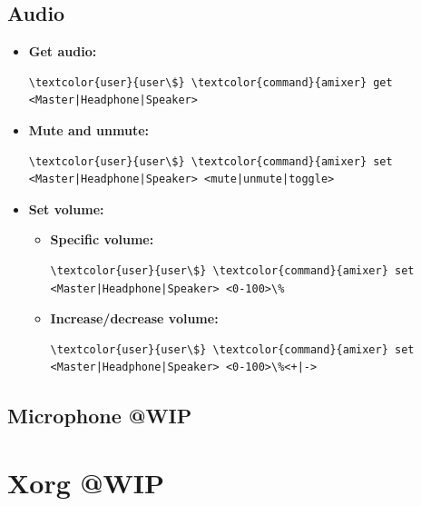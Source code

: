 \documentclass[10pt, a4paper, onecolumn, oneside, titlepage, openany]{book}
\begin{document}
\section{Audio}
\begin{itemize}
    \item \textbf{Get audio:}
\begin{Verbatim}[commandchars=\\\{\}]
\textcolor{user}{user\$} \textcolor{command}{amixer} get <Master|Headphone|Speaker>
\end{Verbatim}
    \item \textbf{Mute and unmute:}
\begin{Verbatim}[commandchars=\\\{\}]
\textcolor{user}{user\$} \textcolor{command}{amixer} set <Master|Headphone|Speaker> <mute|unmute|toggle>
\end{Verbatim}
    \item \textbf{Set volume:}
    \begin{itemize}
        \item \textbf{Specific volume:}
\begin{Verbatim}[commandchars=\\\{\}]
\textcolor{user}{user\$} \textcolor{command}{amixer} set <Master|Headphone|Speaker> <0-100>\%
\end{Verbatim}        
        \item \textbf{Increase/decrease volume:}
\begin{Verbatim}[commandchars=\\\{\}]
\textcolor{user}{user\$} \textcolor{command}{amixer} set <Master|Headphone|Speaker> <0-100>\%<+|->
\end{Verbatim}   
    \end{itemize}
\end{itemize}

\section{Microphone @WIP}


\chapter{Xorg @WIP}
\end{document}
